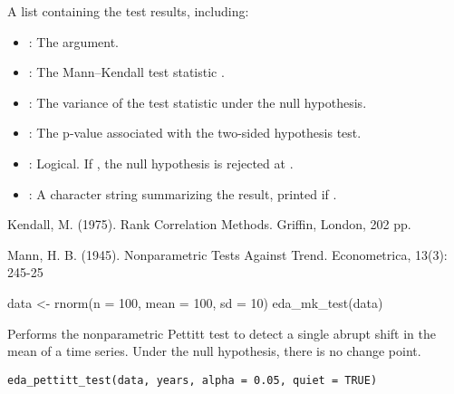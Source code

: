 \documentclass[a4paper]{book}
\begin{document}
%
\begin{Value}
A list containing the test results, including:
\begin{itemize}

\item{} : The  argument.
\item{} : The Mann–Kendall test statistic .
\item{} : The variance of the test statistic under the null hypothesis.
\item{} : The p-value associated with the two-sided hypothesis test.
\item{} : Logical. If , the null hypothesis is rejected at .
\item{} : A character string summarizing the result, printed if .

\end{itemize}

\end{Value}
%
\begin{References}
Kendall, M. (1975). Rank Correlation Methods. Griffin, London, 202 pp.

Mann, H. B. (1945). Nonparametric Tests Against Trend. Econometrica, 13(3): 245-25
\end{References}
%
\begin{SeeAlso}
\end{SeeAlso}
%
\begin{Examples}
\begin{ExampleCode}
data <- rnorm(n = 100, mean = 100, sd = 10)
eda_mk_test(data)

\end{ExampleCode}
\end{Examples}
%
\begin{Description}
Performs the nonparametric Pettitt test to detect a single abrupt shift in the
mean of a time series. Under the null hypothesis, there is no change point.
\end{Description}
%
\begin{Usage}
\begin{verbatim}
eda_pettitt_test(data, years, alpha = 0.05, quiet = TRUE)
\end{verbatim}
\end{Usage}
\end{document}
